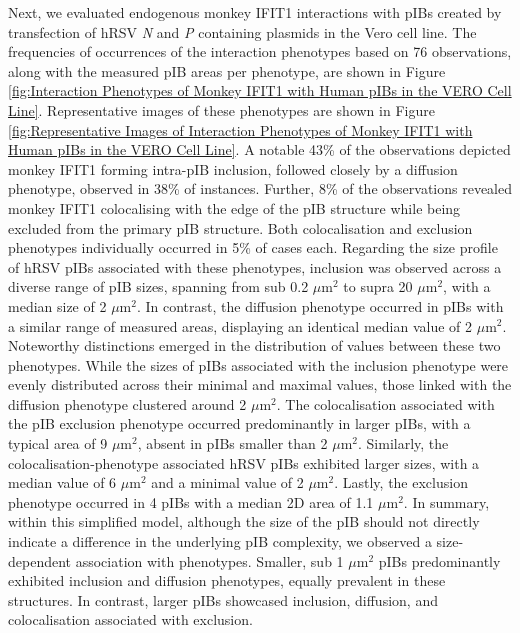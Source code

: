 Next, we evaluated endogenous monkey IFIT1 interactions with pIBs created by transfection of hRSV \textit{N} and \textit{P} containing plasmids in the Vero cell line. The frequencies of occurrences of the interaction phenotypes based on 76 observations, along with the measured pIB areas per phenotype, are shown in Figure \ref{fig:Interaction Phenotypes of Monkey IFIT1 with Human pIBs in the VERO Cell Line}. Representative images of these phenotypes are shown in Figure \ref{fig:Representative Images of Interaction Phenotypes of Monkey IFIT1 with Human pIBs in the VERO Cell Line}. A notable 43\% of the observations depicted monkey IFIT1 forming intra-pIB inclusion, followed closely by a diffusion phenotype, observed in 38\% of instances. Further, 8\% of the observations revealed monkey IFIT1 colocalising with the edge of the pIB structure while being excluded from the primary pIB structure. Both colocalisation and exclusion phenotypes individually occurred in 5\% of cases each. Regarding the size profile of hRSV pIBs associated with these phenotypes, inclusion was observed across a diverse range of pIB sizes, spanning from sub 0.2 \(\mu \mbox{m}^2\) to supra 20 \(\mu \mbox{m}^2\), with a median size of 2 \(\mu \mbox{m}^2\). In contrast, the diffusion phenotype occurred in pIBs with a similar range of measured areas, displaying an identical median value of 2 \(\mu \mbox{m}^2\). Noteworthy distinctions emerged in the distribution of values between these two phenotypes. While the sizes of pIBs associated with the inclusion phenotype were evenly distributed across their minimal and maximal values, those linked with the diffusion phenotype clustered around 2 \(\mu \mbox{m}^2\). The colocalisation associated with the pIB exclusion phenotype occurred predominantly in larger pIBs, with a typical area of 9 \(\mu \mbox{m}^2\), absent in pIBs smaller than 2 \(\mu \mbox{m}^2\). Similarly, the colocalisation-phenotype associated hRSV pIBs exhibited larger sizes, with a median value of 6 \(\mu \mbox{m}^2\) and a minimal value of 2 \(\mu \mbox{m}^2\). Lastly, the exclusion phenotype occurred in 4 pIBs with a median 2D area of 1.1 \(\mu \mbox{m}^2\). In summary, within this simplified model, although the size of the pIB should not directly indicate a difference in the underlying pIB complexity, we observed a size-dependent association with phenotypes. Smaller, sub 1 \(\mu \mbox{m}^2\) pIBs predominantly exhibited inclusion and diffusion phenotypes, equally prevalent in these structures. In contrast, larger pIBs showcased inclusion, diffusion, and colocalisation associated with exclusion.

